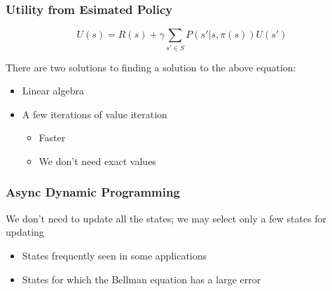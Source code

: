     \subsubsection{Utility from Esimated Policy}

      \begin{equation}
        U\left( s \right)
          = R\left( s \right)
          + \gamma \sum_{s' \in S}
          P\left( s' | s, \pi\left( s \right) \right)
          U\left( s' \right)
      \end{equation}

      There are two solutions to finding a solution to the above equation:

      \begin{itemize}
        \item Linear algebra
        \item A few iterations of value iteration
        \begin{itemize}
          \item Faster
          \item We don't need exact values
        \end{itemize}
      \end{itemize}

    \subsubsection{Async Dynamic Programming}

      We don't need to update all the states; we may select only a few states
      for updating

      \begin{itemize}
        \item States frequently seen in some applications
        \item States for which the Bellman equation has a large error
      \end{itemize}
